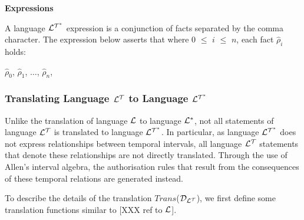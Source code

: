 \documentclass[11pt]{report}
\newenvironment{vquote}
{
  \begin{list}{}{\leftmargin 1em}\item[]
}
{
  \end{list}
}
\begin{document}
\begin{itemize}
            \item
              {\bf Expressions}

              A language ${\cal L^{T^*}}$ expression is a conjunction of
              facts separated by the comma character. The expression below
              asserts that where $0$ $\leq$ $i$ $\leq$ $n$, each fact
              $\hat{\rho}_i$ holds:

              \begin{vquote}
                $\hat{\rho}_0$, 
                $\hat{\rho}_1$, 
                $\ldots$,
                $\hat{\rho}_n$, 
              \end{vquote}

          \end{itemize}

        \subsubsection{Translating Language ${\cal L^T}$ to Language ${\cal L^{T^*}}$}

          Unlike the translation of language ${\cal L}$ to language
          ${\cal L^*}$, not all statements of language ${\cal L^T}$ is
          translated to language ${\cal L^{T^*}}$. In particular, as language
          ${\cal L^{T^*}}$ does not express relationships between temporal
          intervals, all language ${\cal L^T}$ statements that denote these
          relationships are not directly translated. Through the use of Allen's
          interval algebra, the authorisation rules that result from the
          consequences of these temporal relations are generated instead.

          To describe the details of the translation $Trans$(${\cal D_{L^T}}$),
          we first define some translation functions similar to
          [XXX ref to ${\cal L}$].
\end{document}

